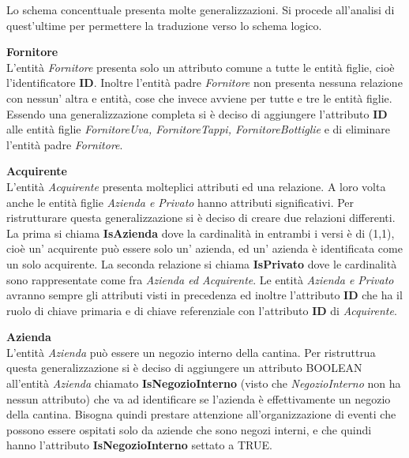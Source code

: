 Lo schema concenttuale presenta molte generalizzazioni. Si procede all'analisi di quest'ultime per permettere la traduzione verso lo schema logico.\\

\begin{flushleft}
\textbf{\large{Fornitore}}\\
L'entità \emph{Fornitore} presenta solo un attributo comune a tutte le entità figlie, cioè l'identificatore \textbf{ID}. Inoltre l'entità padre \emph{Fornitore} non presenta nessuna relazione con nessun' altra e entità, cose che invece avviene per tutte e tre le entità figlie. Essendo una generalizzazione completa si è deciso di aggiungere l'attributo \textbf{ID} alle entità figlie \emph{FornitoreUva, FornitoreTappi, FornitoreBottiglie} e di eliminare l'entità padre \emph{Fornitore}. 
\end{flushleft}


\begin{flushleft}
	\textbf{\large{Acquirente}}\\
	L'entità \emph{Acquirente} presenta molteplici attributi ed una relazione. A loro volta anche le entità figlie \emph{Azienda e Privato} hanno attributi significativi. Per ristrutturare questa generalizzazione si è deciso di creare due relazioni differenti. La prima si chiama \textbf{IsAzienda} dove la cardinalità in entrambi i versi è di (1,1), cioè un' acquirente può essere solo un' azienda, ed un' azienda è identificata come un solo acquirente.
	La seconda relazione si chiama \textbf{IsPrivato} dove le cardinalità sono rappresentate come fra \emph{Azienda ed Acquirente}. Le entità \emph{Azienda e Privato} avranno sempre gli attributi visti in precedenza ed inoltre l'attributo \textbf{ID} che ha il ruolo di chiave primaria e di chiave referenziale con l'attributo \textbf{ID} di \emph{Acquirente}. 
\end{flushleft}

\begin{flushleft}
	\textbf{\large{Azienda}}\\
	L'entità \emph{Azienda} può essere un negozio interno della cantina. Per ristruttrua questa generalizzazione si è deciso di aggiungere un attributo BOOLEAN all'entità \emph{Azienda} chiamato  \textbf{IsNegozioInterno} (visto che \emph{NegozioInterno} non ha nessun attributo) che va ad identificare se l'azienda è effettivamente un negozio della cantina. Bisogna quindi prestare attenzione all'organizzazione di eventi che possono essere ospitati solo da aziende che sono negozi interni, e che quindi hanno l'attributo  \textbf{IsNegozioInterno} settato a TRUE.
\end{flushleft}

